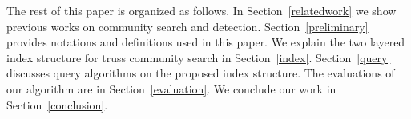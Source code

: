 
The rest of this paper is organized as follows. In Section~\ref{relatedwork} we show previous works on community search and detection. Section~\ref{preliminary} provides notations and definitions used in this paper. We explain the two layered index structure for truss community search in Section~\ref{index}. Section~\ref{query} discusses query algorithms on the proposed index structure. The evaluations of our algorithm are in Section~\ref{evaluation}. We conclude our work in Section~\ref{conclusion}.


~\cite{durmaz2017frequent,zong2015behavior,yin2017taming}



